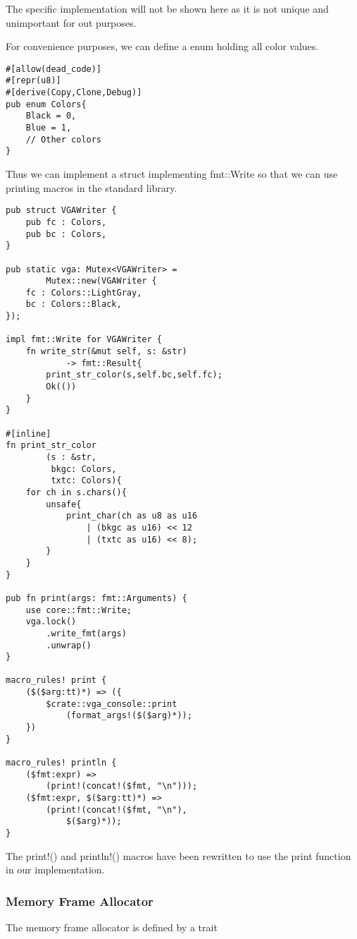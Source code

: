 \documentclass[conference]{IEEEtran}
\begin{document}
The specific implementation will not be shown here as it is not unique and unimportant for out purposes.

For convenience purposes, we can define a enum holding all color values.

\begin{verbatim}
#[allow(dead_code)]
#[repr(u8)]
#[derive(Copy,Clone,Debug)]
pub enum Colors{
    Black = 0,
    Blue = 1,
    // Other colors
}
\end{verbatim}

Thus we can implement a struct implementing fmt::Write so that we can use printing macros in the standard library.

\begin{verbatim}
pub struct VGAWriter {
    pub fc : Colors,
    pub bc : Colors,
}

pub static vga: Mutex<VGAWriter> = 
        Mutex::new(VGAWriter {
    fc : Colors::LightGray,
    bc : Colors::Black,
});

impl fmt::Write for VGAWriter {
    fn write_str(&mut self, s: &str) 
            -> fmt::Result{
        print_str_color(s,self.bc,self.fc);
        Ok(())
    }
}

#[inline]
fn print_str_color
        (s : &str, 
         bkgc: Colors, 
         txtc: Colors){
    for ch in s.chars(){
        unsafe{
            print_char(ch as u8 as u16 
                | (bkgc as u16) << 12 
                | (txtc as u16) << 8);
        }
    }
}

pub fn print(args: fmt::Arguments) {
    use core::fmt::Write;
    vga.lock()
        .write_fmt(args)
        .unwrap()
}

macro_rules! print {
    ($($arg:tt)*) => ({
        $crate::vga_console::print
            (format_args!($($arg)*));
    })
}

macro_rules! println {
    ($fmt:expr) => 
        (print!(concat!($fmt, "\n")));
    ($fmt:expr, $($arg:tt)*) => 
        (print!(concat!($fmt, "\n"), 
            $($arg)*));
}
\end{verbatim}

The print!() and println!() macros have been rewritten to use the print function in our implementation.

\subsubsection{Memory Frame Allocator}

The memory frame allocator is defined by a trait 
\end{document}
